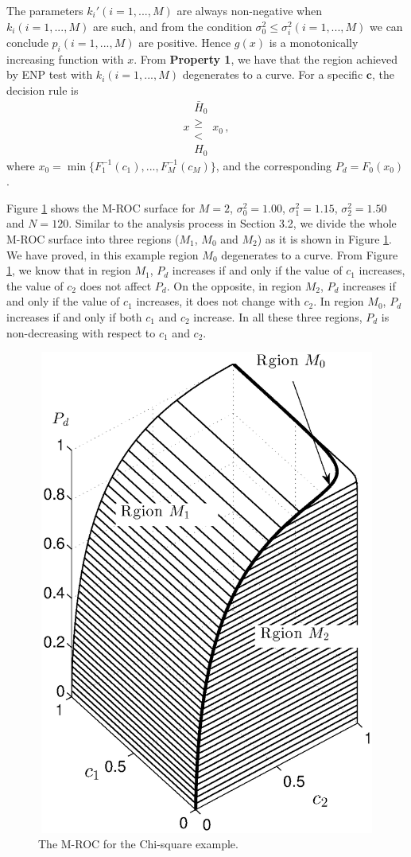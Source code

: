 The parameters $k_i' (i=1, ..., M)$ are always non-negative when $k_i (i=1, ..., M)$ are such, and from 
 the condition $\sigma_0^2 \leq \sigma_i^2 (i=1, ..., M)$ we can conclude $p_i (i=1, ..., M)$ are positive. Hence $g(x)$ is a monotonically increasing function with $x$. From \textbf{Property 1}, we have that the region achieved by ENP test with $k_i (i = 1, ..., M)$ degenerates to a curve. For a specific $\mathbf{c}$, the decision rule is
\begin{equation}
  \label{equ: decision rule chi 2}
  x \substack{\bar{H}_0 \\ \geq \\ < \\ H_0} x_0\,,
\end{equation}
where $x_0 = \min\{F_1^{-1}(c_1), ..., F_M^{-1}(c_M)\}$,
and the corresponding $P_d = F_0(x_0)$. 

Figure \ref{pic: LJS for chisquare} shows the M-ROC surface for $M=2$, $\sigma_0^2 = 1.00$, $\sigma_1^2 = 1.15$, $\sigma_2^2 = 1.50$ and $N=120$. 
Similar to the analysis process in Section 3.2, we divide the whole M-ROC surface into three regions ($M_1$, $M_0$ and $M_2$) as it is shown in Figure \ref{pic: LJS for chisquare}. 
We have proved, in this example region $M_0$ degenerates to a curve.  
From Figure \ref{pic: LJS for chisquare}, we know that in region $M_1$, $P_d$ increases if and only if the value of $c_1$ increases, the value of $c_2$ does not affect $P_d$. On the opposite, in region $M_2$, $P_d$ increases if and only if the value of $c_1$ increases, it does not change with $c_2$. In region $M_0$, $P_d$ increases if and only if both $c_1$ and $c_2$ increase. 
In all these three regions, $P_d$ is non-decreasing with respect to $c_1$ and $c_2$. 

\begin{figure}[!t]
\centering
\includegraphics[width=12cm, height=16cm]{3/example3.eps}
\caption{The M-ROC for the Chi-square example.}
\label{pic: LJS for chisquare}
\end{figure}
